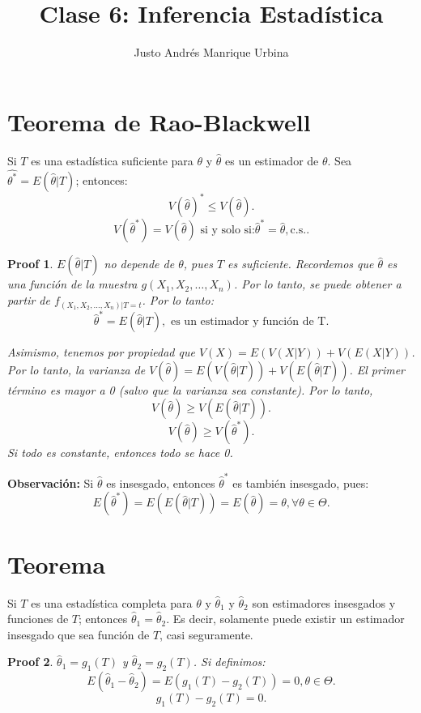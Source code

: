 \documentclass{article}
\title{Clase 6: Inferencia Estadística}
\author{Justo Andrés Manrique Urbina}
\newtheorem{myprf}{Proof}
\begin{document}
\maketitle

\section{Teorema de Rao-Blackwell}

Si $T$ es una estadística suficiente para $\theta$ y $\hat{\theta}$ es un estimador de $\theta$. Sea $\hat{\theta^{*}} = E{(\hat{\theta}|T)}$; entonces:
\[ V{(\hat{\theta})}^{*}\leq V{(\hat{\theta})}.\]
\[ V{(\hat{\theta}^{*})}=V{(\hat{\theta})} \text{ si y solo si:} \hat{\theta}^{*}=\hat{\theta}, \text{c.s.}.\]

\begin{myprf}
	$E{(\hat{\theta}|T)}$ no depende de $\theta$, pues $T$ es suficiente. Recordemos que $\hat{\theta}$ es una función de la muestra $g(X_{1},X_{2},\ldots,X_{n})$. Por lo tanto, se puede obtener a partir de $f_{(X_{1},X_{2},\ldots,X_{n})|T=t}$. Por lo tanto:
	\[ \hat{\theta}^{*}=E{(\hat{\theta}|T)},\text{ es un estimador y función de T}.\]

	Asimismo, tenemos por propiedad que $V{(X)}=E{(V{(X|Y)})} + V{(E{(X|Y)})}$. Por lo tanto, la varianza de $V{(\hat{\theta})}=E{(V{(\hat{\theta}|T)})}+V{(E{(\hat{\theta}|T)})}$. El primer término es mayor a 0 (salvo que la varianza sea constante). Por lo tanto,
	\[ V{(\hat{\theta})}\geq V{(E{(\hat{\theta}|T)})}.\]
	\[ V{(\hat{\theta})} \geq V{(\hat{\theta}^{*})}.\]
Si todo es constante, entonces todo se hace 0.
\end{myprf}
\textbf{Observación: } Si $\hat{\theta}$ es insesgado, entonces $\hat{\theta}^{*}$ es también insesgado, pues:
\[ E{(\hat{\theta}^{*})}=E{(E{(\hat{\theta}|T)})}=E{(\hat{\theta})}=\theta,\forall \theta \in \Theta.\]

\section{Teorema}
Si $T$ es una estadística completa para $\theta$ y $\hat{\theta}_{1}$ y $\hat{\theta}_{2}$ son estimadores insesgados y funciones de $T$; entonces $\hat{\theta}_{1}=\hat{\theta}_{2}$. Es decir, solamente puede existir un estimador insesgado que sea función de $T$, casi seguramente.

\begin{myprf}
	$\hat{\theta}_{1}=g_{1}{(T)}$ y $\hat{\theta}_{2}=g_{2}{(T)}$. Si definimos:
	\[ E{(\hat{\theta}_{1}-\hat{\theta}_{2})}=E{(g_{1}{(T)}-g_{2}{(T)})}=0, \theta \in \Theta.\]
	\[ g_{1}{(T)}-g_{2}{(T)}=0.\]
\end{myprf}
\end{document}
